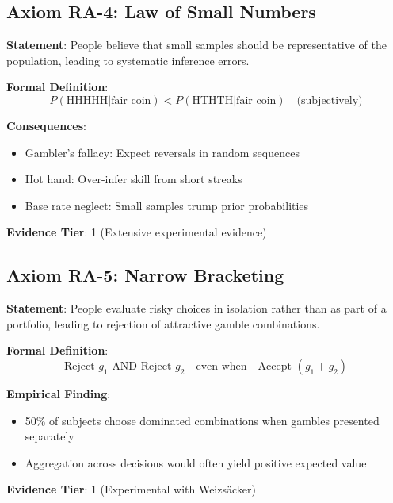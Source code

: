\subsection{Axiom RA-4: Law of Small Numbers}

\begin{tcolorbox}[colback=blue!5!white,colframe=blue!75!black,title=Axiom RA-4: Law of Small Numbers]
\textbf{Statement}: People believe that small samples should be representative of the population, leading to systematic inference errors.

\textbf{Formal Definition}:
\begin{equation}
P(\text{HHHHH}|\text{fair coin}) < P(\text{HTHTH}|\text{fair coin}) \quad \text{(subjectively)}
\end{equation}

\textbf{Consequences}:
\begin{itemize}
    \item Gambler's fallacy: Expect reversals in random sequences
    \item Hot hand: Over-infer skill from short streaks
    \item Base rate neglect: Small samples trump prior probabilities
\end{itemize}

\textbf{Evidence Tier}: 1 (Extensive experimental evidence)
\end{tcolorbox}

\subsection{Axiom RA-5: Narrow Bracketing}

\begin{tcolorbox}[colback=red!5!white,colframe=red!75!black,title=Axiom RA-5: Narrow Bracketing]
\textbf{Statement}: People evaluate risky choices in isolation rather than as part of a portfolio, leading to rejection of attractive gamble combinations.

\textbf{Formal Definition}:
\begin{equation}
\text{Reject } g_1 \text{ AND Reject } g_2 \quad \text{even when} \quad \text{Accept } (g_1 + g_2)
\end{equation}

\textbf{Empirical Finding}:
\begin{itemize}
    \item 50\% of subjects choose dominated combinations when gambles presented separately
    \item Aggregation across decisions would often yield positive expected value
\end{itemize}

\textbf{Evidence Tier}: 1 (Experimental with Weizsäcker)
\end{tcolorbox}


